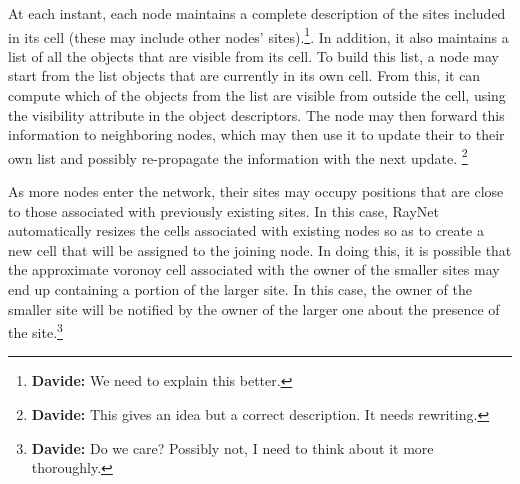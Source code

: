 \documentclass{article}
\newcommand{\df}[1]{\footnote{\textbf{Davide: }#1}}
\newcommand{\inlinedf}[1]{\textit{\textbf{Davide:} #1}}
\begin{document}
At each instant, each node maintains a complete description of the
sites included in its cell (these may include other nodes'
  sites).\df{We need to explain this better.}. In addition, it also
maintains a list of all the objects that are visible from its cell. To
build this list, a node may start from the list objects that are
currently in its own cell. From this, it can compute which of the
objects from the list are visible from outside the cell, using the
visibility attribute in the object descriptors. The node may then
forward this information to neighboring nodes, which may then use it
to update their to their own list and possibly re-propagate the
information with the next update. \df{This gives an idea but a
  correct description. It needs rewriting.}



As more nodes enter the network, their sites may occupy positions that
are close to those associated with previously existing sites. In this
case, RayNet automatically resizes the cells associated with existing
nodes so as to create a new cell that will be assigned to the joining
node. In doing this, it is possible that the approximate voronoy cell
associated with the owner of the smaller sites may end up containing a
portion of the larger site.  In this case, the owner of the smaller
site will be notified by the owner of the larger one about the
presence of the site.\df{Do we care? Possibly not, I need to think
  about it more thoroughly.}






\end{document}
